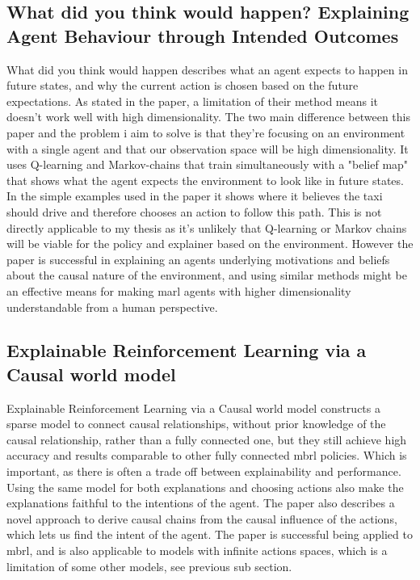 \documentclass[UKenglish]{uiomasterthesis}
\begin{document}
\subsection{What did you think would happen? Explaining Agent Behaviour through Intended Outcomes}
What did you think would happen describes what an agent expects to happen in future states, and why the current action is chosen based on the future expectations. As stated in the paper, a limitation of their method means it doesn't work well with high dimensionality. The two main difference between this paper and the problem i aim to solve is that they're focusing on an environment with a single agent and that our observation space will be high dimensionality. It uses Q-learning and Markov-chains that train simultaneously with a "belief map" that shows what the agent expects the environment to look like in future states. In the simple examples used in the paper it shows where it believes the taxi should drive and therefore chooses an action to follow this path. This is not directly applicable to my thesis as it's unlikely that Q-learning or Markov chains will be viable for the policy and explainer based on the environment. However the paper is successful in explaining an agents underlying motivations and beliefs about the causal nature of the environment, and using similar methods might be an effective means for making \ac{marl} agents with higher dimensionality understandable from a human perspective. 

\subsection{Explainable Reinforcement Learning via a Causal world model}
Explainable Reinforcement Learning via a Causal world model constructs a sparse model to connect causal relationships, without prior knowledge of the causal relationship, rather than a fully connected one, but they still achieve high accuracy and results comparable to other fully connected \ac{mbrl} policies. Which is important, as there is often a trade off between explainability and performance. Using the same model for both explanations and choosing actions also make the explanations faithful to the intentions of the agent. The paper also describes a novel approach to derive causal chains from the causal influence of the actions, which lets us find the intent of the agent. The paper is successful being applied to \ac{mbrl}, and is also applicable to models with infinite actions spaces, which is a limitation of some other models, see previous sub section.
\end{document}
